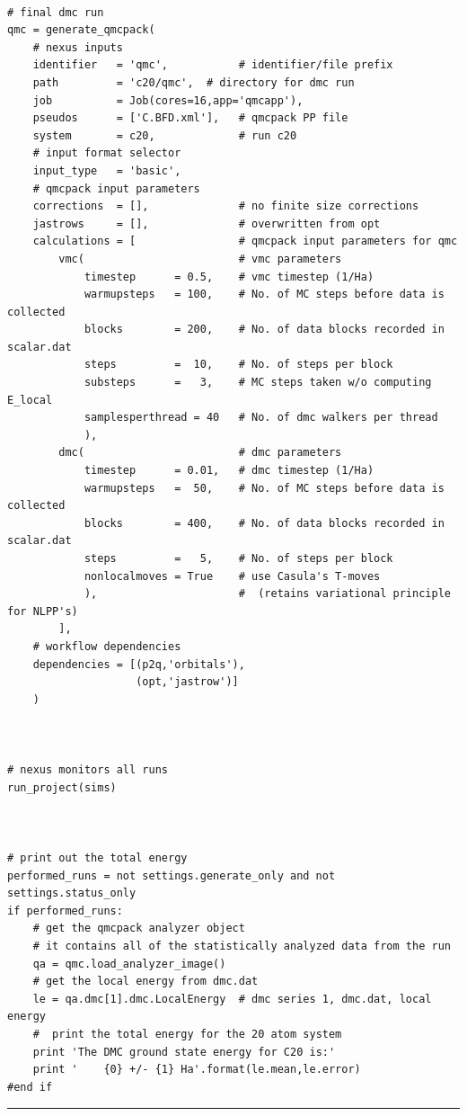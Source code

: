 \documentclass[oneside,11pt]{memoir}
\numberwithin{equation}{section}
\newcommand{\HRule}{\rule{\linewidth}{0.5mm}}
\begin{document}
\begin{verbatim}
    
# final dmc run
qmc = generate_qmcpack( 
    # nexus inputs
    identifier   = 'qmc',           # identifier/file prefix       
    path         = 'c20/qmc',  # directory for dmc run       
    job          = Job(cores=16,app='qmcapp'),
    pseudos      = ['C.BFD.xml'],   # qmcpack PP file
    system       = c20,             # run c20
    # input format selector                                      
    input_type   = 'basic',
    # qmcpack input parameters
    corrections  = [],              # no finite size corrections
    jastrows     = [],              # overwritten from opt
    calculations = [                # qmcpack input parameters for qmc
        vmc(                        # vmc parameters 
            timestep      = 0.5,    # vmc timestep (1/Ha)
            warmupsteps   = 100,    # No. of MC steps before data is collected
            blocks        = 200,    # No. of data blocks recorded in scalar.dat
            steps         =  10,    # No. of steps per block
            substeps      =   3,    # MC steps taken w/o computing E_local
            samplesperthread = 40   # No. of dmc walkers per thread
            ),                      
        dmc(                        # dmc parameters
            timestep      = 0.01,   # dmc timestep (1/Ha)
            warmupsteps   =  50,    # No. of MC steps before data is collected
            blocks        = 400,    # No. of data blocks recorded in scalar.dat
            steps         =   5,    # No. of steps per block
            nonlocalmoves = True    # use Casula's T-moves
            ),                      #  (retains variational principle for NLPP's)
        ],
    # workflow dependencies
    dependencies = [(p2q,'orbitals'),
                    (opt,'jastrow')]
    )



# nexus monitors all runs
run_project(sims)



# print out the total energy
performed_runs = not settings.generate_only and not settings.status_only
if performed_runs:
    # get the qmcpack analyzer object
    # it contains all of the statistically analyzed data from the run
    qa = qmc.load_analyzer_image()
    # get the local energy from dmc.dat
    le = qa.dmc[1].dmc.LocalEnergy  # dmc series 1, dmc.dat, local energy
    #  print the total energy for the 20 atom system
    print 'The DMC ground state energy for C20 is:'
    print '    {0} +/- {1} Ha'.format(le.mean,le.error)
#end if
\end{verbatim}
\HRule
\end{document}
